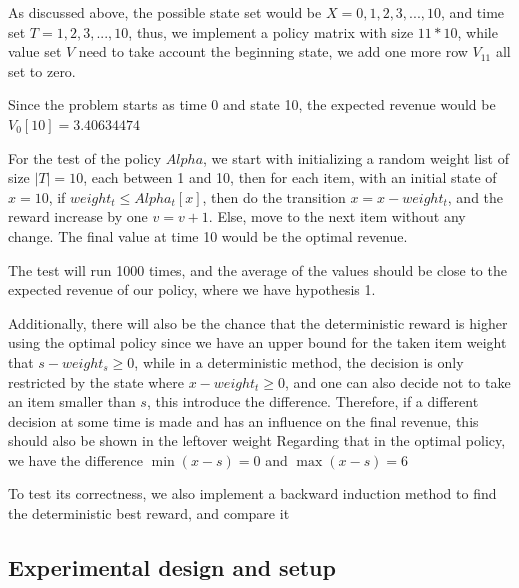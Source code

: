As discussed above, the possible state set would be $X = {0,1,2,3,...,10}$, and time set $T = {1,2,3,...,10}$, thus, we implement a policy matrix with size $11 * 10$, while value set $V$ need to take account the beginning state, we add one more row $V_{11}$ all set to zero.

Since the problem starts as time 0 and state 10, the expected revenue would be $V_0[10] = 3.40634474$

For the test of the policy $Alpha$, we start with initializing a random weight list of size $|T|=10$, each between 1 and 10, then for each item, with an initial state of $x=10$, if $weight_t \leq Alpha_t[x]$, then do the transition $x=x-weight_t$, and the reward increase by one $v=v+1$. Else, move to the next item without any change. The final value at time 10 would be the optimal revenue.

The test will run 1000 times, and the average of the values should be close to the expected revenue of our policy, where we have hypothesis 1.

Additionally, there will also be the chance that the deterministic reward is higher using the optimal policy since we have an upper bound for the taken item weight that $s-weight_s \geq 0$, while in a deterministic method, the decision is only restricted by the state where $x-weight_t \geq 0$, and one can also decide not to take an item smaller than $s$, this introduce the difference. Therefore, if a different decision at some time is made and has an influence on the final revenue, this should also be shown in the leftover weight
Regarding that in the optimal policy, we have the difference $\min(x-s) = 0$ and $\max(x-s)=6$

To test its correctness, we also implement a backward induction method to find the deterministic best reward, and compare it 


\subsection{Experimental design and setup}




